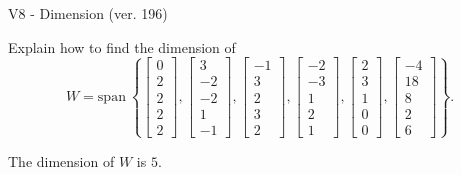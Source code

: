 \begin{exercise}
  \begin{exerciseTitle}V8 - Dimension (ver. 196)\end{exerciseTitle}
  \begin{exerciseStatement}
    Explain how to find the dimension of 
\[W=\mathrm{span}\ \left\{\left[\begin{array}{r}
0 \\
2 \\
2 \\
2 \\
2
\end{array}\right] , \left[\begin{array}{r}
3 \\
-2 \\
-2 \\
1 \\
-1
\end{array}\right] , \left[\begin{array}{r}
-1 \\
3 \\
2 \\
3 \\
2
\end{array}\right] , \left[\begin{array}{r}
-2 \\
-3 \\
1 \\
2 \\
1
\end{array}\right] , \left[\begin{array}{r}
2 \\
3 \\
1 \\
0 \\
0
\end{array}\right] , \left[\begin{array}{r}
-4 \\
18 \\
8 \\
2 \\
6
\end{array}\right]\right\}.\]



  \end{exerciseStatement}
  \begin{exerciseAnswer}
   The dimension of \(W\) is  \(5\).
  


  \end{exerciseAnswer}
\end{exercise}